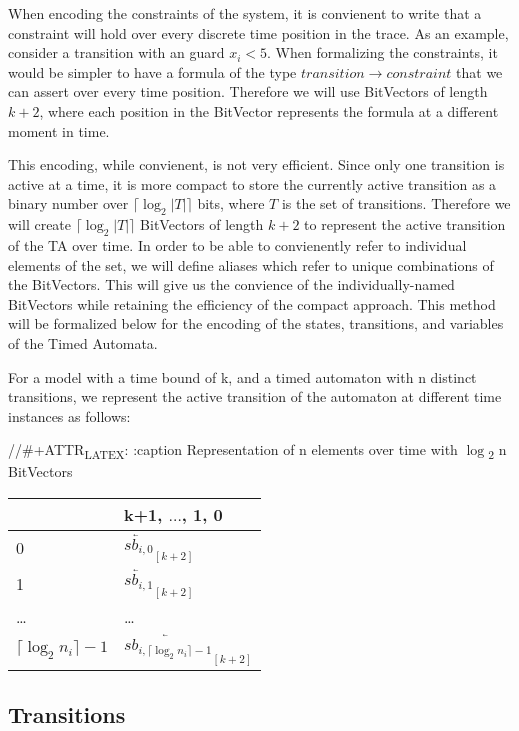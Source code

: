 \documentclass[a4paper,11pt]{article}
\begin{document}
When encoding the constraints of the system, it is convienent to write that a
constraint will hold over every discrete time position in the trace. As an
example, consider a transition with an guard \(x_i < 5\). When formalizing the
constraints, it would be simpler to have a formula of the type \(transition
\rightarrow constraint\) that we can assert over every time position. Therefore
we will use BitVectors of length \(k+2\), where each position in the BitVector
represents the formula at a different moment in time.

This encoding, while convienent, is not very efficient. Since only one
transition is active at a time, it is more compact to store the currently active
transition as a binary number over \(\lceil\log_2 |T|\rceil\) bits, where \(T\)
is the set of transitions. Therefore we will create \(\lceil\log_2 |T|\rceil\)
BitVectors of length \(k+2\) to represent the active transition of the TA over
time. In order to be able to convienently refer to individual elements of the
set, we will define aliases which refer to unique combinations of the
BitVectors. This will give us the convience of the individually-named BitVectors
while retaining the efficiency of the compact approach. This method will be
formalized below for the encoding of the states, transitions, and variables of
the Timed Automata.

For a model with a time bound of k, and a timed automaton with n distinct
transitions, we represent the active transition of the automaton at different
time instances as follows:

//\#+ATTR\textsubscript{LATEX}: :caption Representation of n elements over time with \(\log\)\textsubscript{2} n BitVectors
\begin{center}
\begin{tabular}{ll}
 & k+1, \(\ldots\), 1, 0\\
\hline
0 & \(\overleftarrow{sb_{i,0}}_{[k+2]}\)\\
1 & \(\overleftarrow{sb_{i,1}}_{[k+2]}\)\\
\ldots{} & \ldots{}\\
\(\lceil \log_2 n_i \rceil -1\) & \(\overleftarrow{sb_{i, \lceil \log_2 n_i \rceil -1}}_{[k+2]}\)\\
\end{tabular}
\end{center}


\subsection{Transitions}
\label{sec:org5c35d0d}
\end{document}
